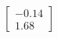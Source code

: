 \documentclass[preview]{standalone}
\begin{document}
\begin{align*}
\begin{bmatrix} -0.14 \\ 1.68 \end{bmatrix}
\end{align*}
\end{document}
